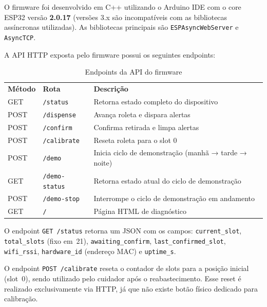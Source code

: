 \documentclass[12pt,a4paper]{article}
\newcommand{\lightrule}{\arrayrulecolor{gray!35}\midrule\arrayrulecolor{black}}
\begin{document}
O firmware foi desenvolvido em C++ utilizando o Arduino IDE com o core ESP32 versão \textbf{2.0.17} (versões 3.x são incompatíveis com as bibliotecas assíncronas utilizadas). As bibliotecas principais são \texttt{ESPAsyncWebServer} e \texttt{AsyncTCP}.

A API HTTP exposta pelo firmware possui os seguintes endpoints:

\begin{table}[H]
    \centering
    \caption{Endpoints da API do firmware}
    \label{tab:endpoints}
    \begin{tabularx}{\textwidth}{llX}
        \toprule
        \textbf{Método} & \textbf{Rota}           & \textbf{Descrição} \\
        \lightrule
        GET             & \texttt{/status}        & Retorna estado completo do dispositivo \\
        \lightrule
        POST            & \texttt{/dispense}      & Avança roleta e dispara alertas \\
        \lightrule
        POST            & \texttt{/confirm}       & Confirma retirada e limpa alertas \\
        \lightrule
        POST            & \texttt{/calibrate}     & Reseta roleta para o slot 0 \\
        \lightrule
        POST            & \texttt{/demo}          & Inicia ciclo de demonstração (manhã → tarde → noite) \\
        \lightrule
        GET             & \texttt{/demo-status}   & Retorna estado atual do ciclo de demonstração \\
        \lightrule
        POST            & \texttt{/demo-stop}     & Interrompe o ciclo de demonstração em andamento \\
        \lightrule
        GET             & \texttt{/}              & Página HTML de diagnóstico \\
        \bottomrule
    \end{tabularx}
\end{table}

O endpoint \texttt{GET /status} retorna um JSON com os campos:
\texttt{current\_slot}, \texttt{total\_slots} (fixo em~21), \texttt{awaiting\_confirm},
\texttt{last\_confirmed\_slot}, \texttt{wifi\_rssi}, \texttt{hardware\_id} (endereço MAC) e \texttt{uptime\_s}.

O endpoint \texttt{POST /calibrate} reseta o contador de slots para a posição inicial (slot~0), sendo utilizado pelo cuidador após o reabastecimento. Esse reset é realizado exclusivamente via HTTP, já que não existe botão físico dedicado para calibração.
\end{document}
